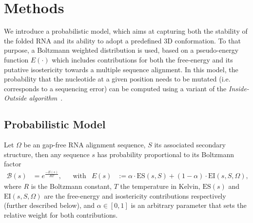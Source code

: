 \section{Methods}
\label{sec:methods}

\newcommand{\PE}[1]{E(#1)}
\newcommand{\EI}{\text{EI}}
\newcommand{\ES}{\text{ES}}
\newcommand{\ISO}{\text{ISO}}
We introduce a probabilistic model, which aims at capturing both the stability of the folded RNA and its ability to adopt a predefined 3D conformation.
To that purpose, a Boltzmann weighted distribution is used, based on a pseudo-energy function $\PE{\cdot}$ which includes contributions for both the free-energy and its putative isostericity towards a multiple sequence alignment. In this model, the probability that the nucleotide at a given position needs to be mutated (i.e. corresponds to a sequencing error) can be computed using a variant of the \emph{Inside-Outside algorithm}~\cite{Lari1990}.

\subsection{Probabilistic Model}
Let $\Omega$ be an gap-free RNA alignment sequence, $S$ its associated secondary structure, 
then any sequence $s$ has probability proportional to its Boltzmann factor
\begin{align*}
  \mathcal{B}(s) &= e^\frac{-\PE{s}}{RT}, &&\text{with}&\PE{s}&:=\alpha\cdot\ES(s,S)+(1-\alpha)\cdot\EI(s,S,\Omega),
\end{align*}
where $R$ is the Boltzmann constant, $T$ the temperature in Kelvin, $\ES(s)$ and $\EI(s,S,\Omega)$ 
are the free-energy and isostericity contributions respectively (further described below), and $\alpha\in[0,1]$ is an arbitrary parameter that sets the relative weight for both contributions.

